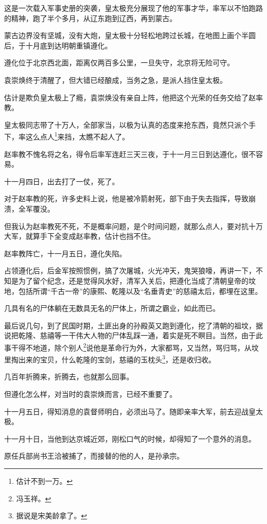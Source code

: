 \begin{multicols}{\theparacolNo}
		这是一次载入军事史册的突袭，皇太极充分展现了他的军事才华，率军以不怕跑路的精神，跑了半个多月，从辽东跑到辽西，再到蒙古。

		蒙古边界没有坚城，没有大炮，皇太极十分轻松地跨过长城，在地图上画个半圆后，于十月底到达明朝重镇遵化。

		遵化位于北京西北面，距离仅两百多公里，一旦失守，北京将无险可守。

		袁崇焕终于清醒了，但大错已经酿成，当务之急，是派人挡住皇太极。

		估计是欺负皇太极上了瘾，袁崇焕没有亲自上阵，他把这个光荣的任务交给了赵率教。

		皇太极同志带了十万人，全部家当，以极为认真的态度来抢东西，竟然只派个手下，率这么点人\footnote{估计不到一万。}来挡，太瞧不起人了。

		赵率教不愧名将之名，得令后率军连赶三天三夜，于十一月三日到达遵化，很不容易。

		十一月四日，出去打了一仗，死了。

		对于赵率教的死，许多史料上说，他是被冷箭射死，部下由于失去指挥，导致崩溃，全军覆没。

		但我认为赵率教死不死，不是概率问题，是个时间问题，就那么点人，要对抗十万大军，就算手下全变成赵率教，估计也挡不住。

		赵率教阵亡，十一月五日，遵化失陷。

		占领遵化后，后金军按照惯例，搞了次屠城，火光冲天，鬼哭狼嚎，再讲一下，不知是为了留个纪念，还是觉得风水好，清军入关后，把遵化当成了清朝皇帝的坟地，包括所谓“千古一帝”的康熙、乾隆以及“名垂青史”的慈禧太后，都埋在这里。

		几具有名的尸体躺在无数具无名的尸体上，所谓之霸业，如此而已。

		最后说几句，到了民国时期，土匪出身的孙殿英又跑到遵化，挖了清朝的祖坟，据说把乾隆、慈禧等一干伟大人物的尸体乱踩一通，着实是死不瞑目。当然，由于此事干得不地道，除个别人\footnote{冯玉祥。}说他是革命行为外，大家都骂，又当然，骂归骂，从坟里掏出来的宝贝，什么乾隆的宝剑，慈禧的玉枕头\footnote{据说是宋美龄拿了。}，还是收归收。

		几百年折腾来，折腾去，也就那么回事。

		但遵化怎么样，对当时的袁崇焕而言，已经不重要了。

		十一月五日，得知消息的袁督师明白，必须出马了。随即亲率大军，前去迎战皇太极。

		十一月十日，当他到达京城近郊，刚松口气的时候，却得知了一个意外的消息。

		原任兵部尚书王洽被捕了，而接替的他的人，是孙承宗。


\end{multicols}
